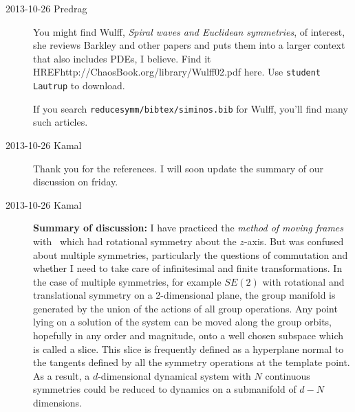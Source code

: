 \begin{description}
\item[2013-10-26 Predrag] You might find
Wulff, {\em Spiral waves and {Euclidean} symmetries}, of
interest, she reviews Barkley and other papers and puts them into a
larger context that also includes PDEs, I believe. Find it
HREF{http://ChaosBook.org/library/Wulff02.pdf} {here}. Use
\texttt{student} \texttt{Lautrup} to download.

If you search \texttt{reducesymm/bibtex/siminos.bib} for Wulff,
you'll find many such articles.

\item[2013-10-26 Kamal] Thank you for the references. I will soon
update the summary of our discussion on friday.

\item[2013-10-26 Kamal] \textbf{Summary of discussion:} I have practiced the
\emph{method of moving frames} with \cLf\ which had rotational symmetry about
the $z$-axis. But was confused about multiple symmetries, particularly the questions
of commutation and whether I need to take care of infinitesimal and finite transformations.
In the case of multiple
symmetries, for example $SE(2)$ with
rotational and translational symmetry on a 2-dimensional plane, the group manifold
is generated by the union of the actions of all group operations. Any point
lying on a solution of the system can be moved along the group orbits, hopefully
in any order and magnitude, onto a well chosen subspace which is called a slice.
This slice is frequently defined as a hyperplane normal to the tangents defined by
all the symmetry operations at the template point. As a result, a $d$-dimensional
dynamical system with $N$ continuous symmetries could be reduced to dynamics on a submanifold
of $d-N$ dimensions.


\end{description}
